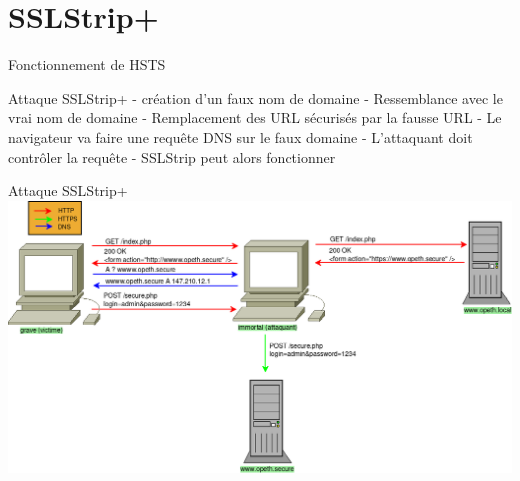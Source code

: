 \section{SSLStrip+}

\begin{frame}{Fonctionnement de HSTS}

\end{frame}

\begin{frame}{Attaque SSLStrip+}
  - création d'un faux nom de domaine
  - Ressemblance avec le vrai nom de domaine
  - Remplacement des URL sécurisés par la fausse URL
  - Le navigateur va faire une requête DNS sur le faux domaine
  - L'attaquant doit contrôler la requête
  - SSLStrip peut alors fonctionner
\end{frame}

\begin{frame}{Attaque SSLStrip+}
    \includegraphics[width=\linewidth]{../medias/sslstrip2/attack.png}
\end{frame}

